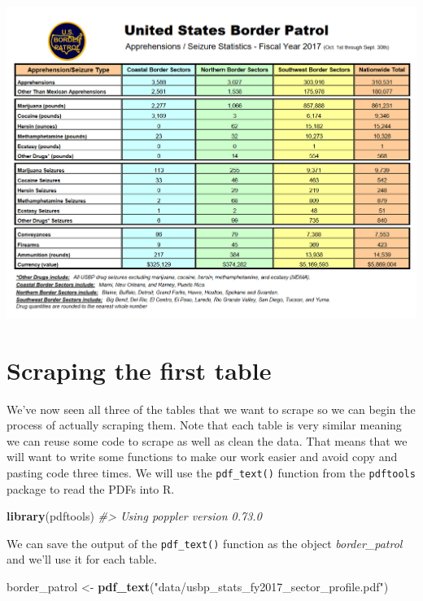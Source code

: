 \documentclass[
  12pt,
]{book}
\newenvironment{Shaded}{\begin{snugshade}}{\end{snugshade}}
\newcommand{\CommentTok}[1]{\textcolor[rgb]{0.56,0.35,0.01}{\textit{#1}}}
\newcommand{\KeywordTok}[1]{\textcolor[rgb]{0.13,0.29,0.53}{\textbf{#1}}}
\newcommand{\NormalTok}[1]{#1}
\newcommand{\StringTok}[1]{\textcolor[rgb]{0.31,0.60,0.02}{#1}}
\begin{document}
\includegraphics{images/pdf_table_4.PNG}

\hypertarget{scraping-the-first-table}{%
\section{Scraping the first table}\label{scraping-the-first-table}}

We've now seen all three of the tables that we want to scrape so we can begin the process of actually scraping them. Note that each table is very similar meaning we can reuse some code to scrape as well as clean the data. That means that we will want to write some functions to make our work easier and avoid copy and pasting code three times. We will use the \texttt{pdf\_text()} function from the \texttt{pdftools} package to read the PDFs into R.

\begin{Shaded}
\begin{Highlighting}[]
\KeywordTok{library}\NormalTok{(pdftools)}
\CommentTok{\#> Using poppler version 0.73.0}
\end{Highlighting}
\end{Shaded}

We can save the output of the \texttt{pdf\_text()} function as the object \emph{border\_patrol} and we'll use it for each table.

\begin{Shaded}
\begin{Highlighting}[]
\NormalTok{border\_patrol <{-}}\StringTok{ }\KeywordTok{pdf\_text}\NormalTok{(}\StringTok{"data/usbp\_stats\_fy2017\_sector\_profile.pdf"}\NormalTok{)}
\end{Highlighting}
\end{Shaded}
\end{document}

